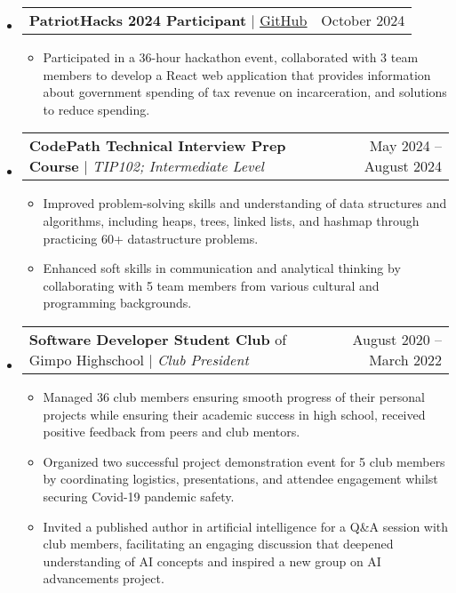 \documentclass[letterpaper,11pt]{article}
\makeatletter
\newcommand{\resumeItem}[1]{
  \item\small{
    {#1 \vspace{-3pt}}
  }
}
\newcommand{\resumeProjectHeading}[2]{
    \item
    \begin{tabular*}{0.97\textwidth}{l@{\extracolsep{\fill}}r@{\hspace{-0.2in}}}
        \small#1 & #2 \\
    \end{tabular*}\vspace{-7pt}
}
\newcommand{\resumeSubHeadingListStart}{\begin{itemize}[leftmargin=0.00in, rightmargin=-0.2in, label={}]}
\newcommand{\resumeSubHeadingListEnd}{\end{itemize}}
\newcommand{\resumeItemListStart}{\begin{itemize}[leftmargin=0.15in, rightmargin=0.15in]}
\newcommand{\resumeItemListEnd}{\end{itemize}\vspace{-7pt}}
\makeatother
\begin{document}
    \resumeSubHeadingListStart
        \resumeProjectHeading
            {\textbf{PatriotHacks 2024 Participant} $|$ \href{https://github.com/juhun32/Prison-Break}{\underline{GitHub}}}{October 2024}
            \resumeItemListStart
                \resumeItem{Participated in a 36-hour hackathon event, collaborated with 3 team members to develop a React web application that provides information about government spending of tax revenue on incarceration, and solutions to reduce spending.}
                \resumeItemListEnd
        \resumeSubHeadingListEnd

    \resumeSubHeadingListStart
        \resumeProjectHeading
            {\textbf{CodePath Technical Interview Prep Course} $|$ \emph{TIP102; Intermediate Level}}{May 2024 -- August 2024}
            \resumeItemListStart
                \resumeItem{Improved problem-solving skills and understanding of data structures and algorithms, including heaps, trees, linked lists, and hashmap through practicing 60+ datastructure problems.}
                \resumeItem{Enhanced soft skills in communication and analytical thinking by collaborating with 5 team members from various cultural and programming backgrounds.}
                \resumeItemListEnd
        \resumeSubHeadingListEnd

    \resumeSubHeadingListStart
        \resumeProjectHeading
            {\textbf{Software Developer Student Club} of Gimpo Highschool $|$ \emph{Club President}}{August 2020 -- March 2022}
            \resumeItemListStart
                \resumeItem{Managed 36 club members ensuring smooth progress of their personal projects while ensuring their academic success in high school, received positive feedback from peers and club mentors.}
                \resumeItem{Organized two successful project demonstration event for 5 club members by coordinating logistics, presentations, and attendee engagement whilst securing Covid-19 pandemic safety.}
                \resumeItem{Invited a published author in artificial intelligence for a Q\&A session with club members, facilitating an engaging discussion that deepened understanding of AI concepts and inspired a new group on AI advancements project.}
            \resumeItemListEnd
        \resumeSubHeadingListEnd
\end{document}
